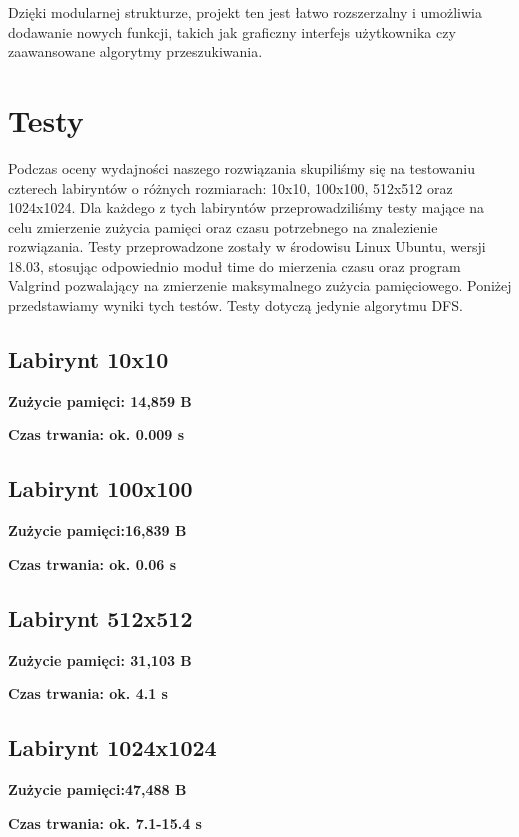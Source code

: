 \documentclass{article}
\begin{document}
Dzięki modularnej strukturze, projekt ten jest łatwo rozszerzalny i umożliwia dodawanie nowych funkcji, takich jak graficzny interfejs użytkownika czy zaawansowane algorytmy przeszukiwania.

\section{Testy}

Podczas oceny wydajności naszego rozwiązania skupiliśmy się na testowaniu czterech labiryntów o różnych rozmiarach: 10x10, 100x100, 512x512 oraz 1024x1024. Dla każdego z tych labiryntów przeprowadziliśmy testy mające na celu zmierzenie zużycia pamięci oraz czasu potrzebnego na znalezienie rozwiązania. Testy przeprowadzone zostały w środowisu Linux Ubuntu, wersji 18.03, stosując odpowiednio moduł time do mierzenia czasu oraz program Valgrind pozwalający na zmierzenie maksymalnego zużycia pamięciowego. Poniżej przedstawiamy wyniki tych testów. Testy dotyczą jedynie algorytmu DFS.

\subsection{Labirynt 10x10}

\textbf{Zużycie pamięci: 14,859 B}

\textbf{Czas trwania: ok. 0.009 s}

\subsection{Labirynt 100x100}

\textbf{Zużycie pamięci:16,839 B}

\textbf{Czas trwania: ok. 0.06 s}

\subsection{Labirynt 512x512}

\textbf{Zużycie pamięci: 31,103 B}

\textbf{Czas trwania: ok. 4.1 s}

\subsection{Labirynt 1024x1024}

\textbf{Zużycie pamięci:47,488 B}

\textbf{Czas trwania: ok. 7.1-15.4 s}
\end{document}
